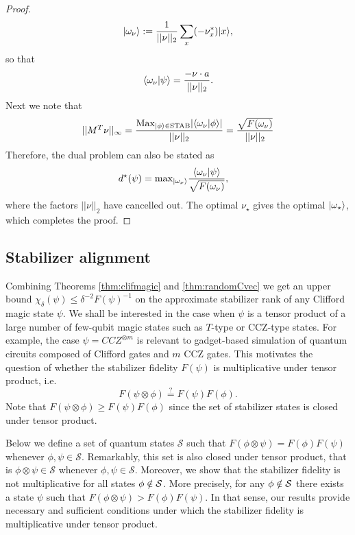 \begin{proof}
\begin{equation}
\vert\omega_\nu\rangle : = \frac{1}{||\nu ||_2 } \sum_{{x}} (-\nu^*_{{x}}) \vert{x}\rangle ,
\end{equation}
so that 
\begin{equation}
\langle \omega_\nu\vert \psi\rangle =  \frac{-  \nu \cdot {a}}{ ||\nu ||_2 } .
\end{equation}
Next we note that 
\begin{equation}
||M^T\nu ||_{\infty} = \frac{\mathrm{Max}_{\vert\phi\rangle \in \mathrm{STAB}} |	\langle \omega_\nu\vert \phi\rangle   | }{ || \nu ||_2 } = \frac{\sqrt{F(\omega_\nu)}}{|| \nu ||_2}
\end{equation}
Therefore, the dual problem can also be stated as 
\begin{align}
	d^{\star}( \psi )  &  =  \mathrm{max}_{\vert\omega_{\nu}\rangle}	\frac{\langle \omega_\nu\vert \psi\rangle}{\sqrt{F(\omega_\nu)}}  ,
\end{align}
where the factors $|| \nu ||_2$ have cancelled out.  The optimal $\nu_\star$ gives the optimal  $\vert\omega_\star\rangle$, which completes the proof.
\end{proof}

\subsection{Stabilizer alignment}
\label{Sec_Fid_Multi}
Combining Theorems \ref{thm:clifmagic} and \ref{thm:randomCvec} we get an upper bound
$\chi_{\delta}(\psi)\leq \delta^{-2} F(\psi)^{-1}$ on the approximate stabilizer rank of any Clifford magic state $\psi$.
We shall be  interested in the case when $\psi$ is a tensor product of 
a large number of few-qubit magic states such as $T$-type or CCZ-type states. For example, the case $\psi=CCZ^{\otimes m}$ is relevant to gadget-based simulation of 
quantum circuits composed of Clifford gates and $m$ CCZ gates. 
This motivates the question of whether the stabilizer fidelity $F(\psi)$ is multiplicative
under tensor product, i.e. \begin{equation}
F(\psi\otimes \phi)\stackrel{?}{=}F(\psi)F(\phi).
\label{eq:fmult}
\end{equation}
Note that $F(\psi\otimes \phi)\ge F(\psi)F(\phi)$ 
since the set of stabilizer states is closed under tensor product. 

Below we define a set of quantum states $\mathcal{S}$ such that 
$F(\phi \otimes \psi) =F(\phi)F(\psi)$ whenever $\phi,\psi\in \mathcal{S}$. Remarkably, this set is also closed under tensor product, that is $\phi\otimes \psi \in \mathcal{S}$ whenever $\phi,\psi\in \mathcal{S}$.
Moreover, we show that the stabilizer fidelity is not multiplicative for all states
$\phi \notin {\cal S }$. More precisely, for any $\phi \notin {\cal S }$ there exists a state $\psi$
such that $F(\phi\otimes \psi)>F(\phi) F(\psi)$. In that sense, our results provide
necessary and sufficient conditions under which the stabilizer fidelity is multiplicative
under tensor product.

